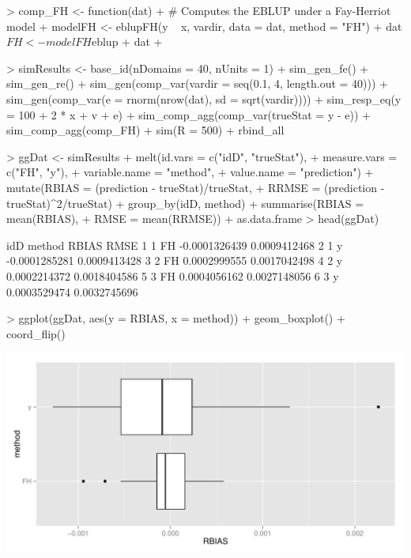 \documentclass[article]{ajs}
\begin{document}
\begin{Schunk}
\begin{Sinput}
> comp_FH <- function(dat) {
+   # Computes the EBLUP under a Fay-Herriot model
+   modelFH <- eblupFH(y ~ x, vardir, data = dat, method = "FH")
+   dat$FH <- modelFH$eblup
+   dat
+ }
\end{Sinput}
\end{Schunk}

\begin{Schunk}
\begin{Sinput}
> simResults <- base_id(nDomains = 40, nUnits = 1) %
+   sim_gen_fe() %
+   sim_gen_re() %
+   sim_gen(comp_var(vardir = seq(0.1, 4, length.out = 40))) %
+   sim_gen(comp_var(e = rnorm(nrow(dat), sd = sqrt(vardir)))) %
+   sim_resp_eq(y = 100 + 2 * x + v + e) %
+   sim_comp_agg(comp_var(trueStat = y - e)) %
+   sim_comp_agg(comp_FH) %
+   sim(R = 500) %
+   rbind_all
\end{Sinput}
\end{Schunk}

\begin{Schunk}
\begin{Sinput}
> ggDat <- simResults %
+   melt(id.vars = c("idD", "trueStat"), 
+        measure.vars = c("FH", "y"), 
+        variable.name = "method",
+        value.name = "prediction") %
+   mutate(RBIAS = (prediction - trueStat)/trueStat,
+          RRMSE = (prediction - trueStat)^2/trueStat) %
+   group_by(idD, method) %
+   summarise(RBIAS = mean(RBIAS),
+             RMSE = mean(RRMSE)) %
+   as.data.frame
> head(ggDat)
\end{Sinput}
\begin{Soutput}
  idD method         RBIAS         RMSE
1   1     FH -0.0001326439 0.0009412468
2   1      y -0.0001285281 0.0009413428
3   2     FH  0.0002999555 0.0017042498
4   2      y  0.0002214372 0.0018404586
5   3     FH  0.0004056162 0.0027148056
6   3      y  0.0003529474 0.0032745696
\end{Soutput}
\end{Schunk}


\begin{Schunk}
\begin{Sinput}
> ggplot(ggDat, aes(y = RBIAS, x = method)) + geom_boxplot() + coord_flip()
\end{Sinput}
\end{Schunk}

\includegraphics[width = \textwidth]{saeSim-modelSimBIAS.pdf}
\end{document}
